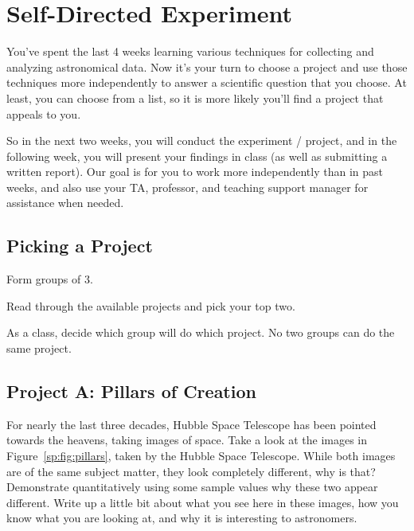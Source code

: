\chapter{Self-Directed Experiment}

You've spent the last 4 weeks learning various techniques for collecting and analyzing astronomical data. Now it's your turn to choose a project and use those techniques more independently to answer a scientific question that you choose. At least, you can choose from a list, so it is more likely you'll find a project that appeals to you.

So in the next two weeks, you will conduct the experiment / project, and in the following week, you will present your findings in class (as well as submitting a written report). Our goal is for you to work more independently than in past weeks, and also use your TA, professor, and teaching support manager for assistance when needed.

\section{Picking a Project}

\begin{steps}
	\item Form groups of 3.
	
	\item Read through the available projects and pick your top two.
	
	\item As a class, decide which group will do which project. No two groups can do the same project.
\end{steps}

\section{Project A: Pillars of Creation}

For nearly the last three decades, Hubble Space Telescope has been pointed towards the heavens, taking images of space. Take a look at the images in Figure\ \ref{sp:fig:pillars}, taken by the Hubble Space Telescope. While both images are of the same subject matter, they look completely different, why is that? Demonstrate quantitatively using some sample values why these two appear different. Write up a little bit about what you see here in these images, how you know what you are looking at, and why it is interesting to astronomers.

